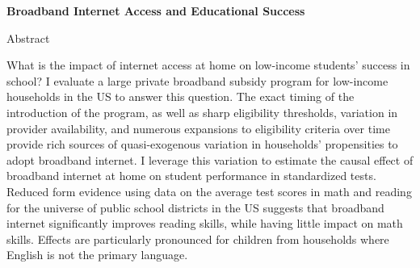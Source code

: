 \documentclass[letterpaper,11pt]{article}
\begin{document}
\Large{\textbf{Broadband Internet Access and Educational Success}}

\small{ }

 \bigskip

Abstract

\medskip




What is the impact of internet access at home on low-income students' success in school? I evaluate a large private broadband subsidy program for low-income households in the US to answer this question. The exact timing of the introduction of the program, as well as sharp eligibility thresholds, variation in provider availability, and numerous expansions to eligibility criteria over time provide rich sources of quasi-exogenous variation in households' propensities to adopt broadband internet. I leverage this variation to estimate the causal effect of broadband internet at home on student performance in standardized tests. Reduced form evidence using data on the average test scores in math and reading for the universe of public school districts in the US suggests that broadband internet significantly improves reading skills, while having little impact on math skills. Effects are particularly pronounced for children from households where English is not the primary language.

\bigskip
\end{document}
